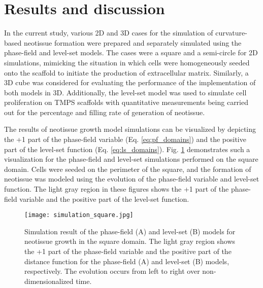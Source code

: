 \section{Results and discussion}

In the current study, various 2D and 3D cases for the simulation of curvature-based neotissue formation were prepared and separately simulated using the phase-field and level-set models. The cases were a square and a semi-circle for 2D simulations, mimicking the situation in which cells were homogeneously seeded onto the scaffold to initiate the production of extracellular matrix. Similarly, a 3D cube was considered for evaluating the performance of the implementation of both models in 3D. Additionally, the level-set model was used to simulate cell proliferation on TMPS scaffolds with quantitative measurements being carried out for the percentage and filling rate of generation of neotissue.

The results of neotissue growth model simulations can be visualized by depicting the +1 part of the phase-field variable (Eq. \ref{eq:pf_domains}) and the positive part of the level-set function (Eq. \ref{eq:ls_domains}). Fig. \ref{fig:tissue_simulation_square} demonstrates such a visualization for the phase-field and level-set simulations performed on the square domain. Cells were seeded on the perimeter of the square, and the formation of neotissue was modeled using the evolution of the phase-field variable and level-set function. The light gray region in these figures shows the +1 part of the phase-field variable and the positive part of the level-set function.

\begin{figure}
\centering
\medskip
\texttt{[image: simulation\_square.jpg]}
\caption[Simulation result of neotissue growth in the square domain]{Simulation result of the phase-field (A) and level-set (B) models for neotissue growth in the square domain. The light gray region shows the +1 part of the phase-field variable and the positive part of the distance function for the phase-field (A) and level-set (B) models, respectively. The evolution occurs from left to right over non-dimensionalized time.}
\label{fig:tissue_simulation_square}
\end{figure}

